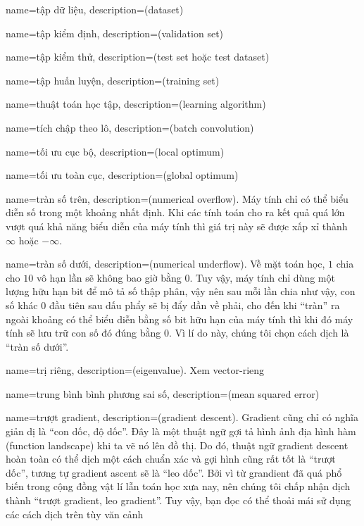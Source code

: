 {
    name={tập dữ liệu},
    description={(dataset)}
}

{
    name={tập kiểm định},
    description={(validation set)}
}

{
    name={tập kiểm thử},
    description={(test set hoặc test dataset)}
}

{
    name={tập huấn luyện},
    description={(training set)}
}

{
    name={thuật toán học tập},
    description={(learning algorithm)}
}

{
    name={tích chập theo lô},
    description={(batch convolution)}
}

{
    name={tối ưu cục bộ},
    description={(local optimum)}
}

{
    name={tối ưu toàn cục},
    description={(global optimum)}
}

{
    name={tràn số trên},
    description={(numerical overflow). Máy tính
    chỉ có thể biểu diễn số trong một khoảng nhất định.
    Khi các tính toán cho ra kết quả quá lớn vượt quá
    khả năng biểu diễn của máy tính thì giá trị này sẽ
    được xấp xỉ thành $\infty$ hoặc $-\infty$.}
}

{
    name={tràn số dưới},
    description={(numerical underflow). Về mặt toán học,
    $1$ chia cho $10$ vô hạn lần sẽ không bao giờ bằng $0$.
    Tuy vậy, máy tính chỉ dùng một lượng hữu hạn bit để mô tả
    số thập phân, vậy nên sau mỗi lần chia như vậy, con số
    khác $0$ đầu tiên sau dấu phẩy sẽ bị đẩy dần về phải,
    cho đến khi ``tràn'' ra ngoài khoảng có thể biểu diễn
    bằng số bit hữu hạn của máy tính thì khi đó máy tính
    sẽ lưu trữ con số đó đúng bằng $0$. Vì lí do này,
    chúng tôi chọn cách dịch là ``tràn số dưới''.}
}

{
    name={trị riêng},
    description={(eigenvalue). Xem \gls{vector-rieng}}
}

{
    name={trung bình bình phương sai số},
    description={(mean squared error)}
}


{
    name={trượt gradient},
    description={(gradient descent). Gradient cũng chỉ có
    nghĩa giản dị là ``con dốc, độ dốc''. Đây là một thuật ngữ
    gợi tả hình ảnh địa hình hàm (function landscape) khi ta
    vẽ nó lên đồ thị. Do đó, thuật ngữ gradient descent
    hoàn toàn có thể dịch một cách chuẩn xác và gợi hình
    cũng rất tốt là ``trượt dốc'', tương tự gradient ascent
    sẽ là ``leo dốc''. Bởi vì từ grandient đã quá phổ biến
    trong cộng đồng vật lí lẫn toán học xưa nay, nên chúng
    tôi chấp nhận dịch thành ``trượt gradient, leo gradient''.
    Tuy vậy, bạn đọc có thể thoải mái sử dụng các cách dịch trên
    tùy văn cảnh}
}

